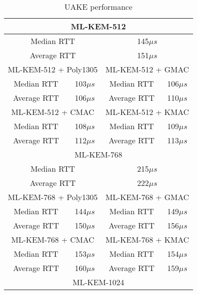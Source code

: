\documentclass[floatrow,journal=tches,submission]{iacrtrans}
\newcommand{\us}{\mu s}
\begin{document}
\begin{table}[H]
    \caption{UAKE performance}\label{tbl:uake}
    \begin{tabular}{|c|c|c|c|}
        \hline
        \multicolumn{4}{|c|}{ML-KEM-512} \\
        \hline
        \multicolumn{2}{|c|}{Median RTT}
        & \multicolumn{2}{|c|}{145$\us$} \\
        \hline
        \multicolumn{2}{|c|}{Average RTT}
        & \multicolumn{2}{|c|}{151$\us$} \\
        \hline\hline
        \multicolumn{2}{|c|}{ML-KEM-512 + Poly1305}
        & \multicolumn{2}{|c|}{ML-KEM-512 + GMAC} \\
        \hline
        Median RTT & 103$\us$ & Median RTT & 106$\us$ \\
        \hline
        Average RTT & 106$\us$ & Average RTT & 110$\us$ \\
        \hline\hline
        \multicolumn{2}{|c|}{ML-KEM-512 + CMAC}
        & \multicolumn{2}{|c|}{ML-KEM-512 + KMAC} \\
        \hline
        Median RTT & 108$\us$ & Median RTT & 109$\us$ \\
        \hline
        Average RTT & 112$\us$ & Average RTT & 113$\us$ \\
        \hline
        \multicolumn{4}{|c|}{ML-KEM-768} \\
        \hline
        \multicolumn{2}{|c|}{Median RTT}
        & \multicolumn{2}{|c|}{215$\us$} \\
        \hline
        \multicolumn{2}{|c|}{Average RTT}
        & \multicolumn{2}{|c|}{222$\us$} \\
        \hline\hline
        \multicolumn{2}{|c|}{ML-KEM-768 + Poly1305}
        & \multicolumn{2}{|c|}{ML-KEM-768 + GMAC} \\
        \hline
        Median RTT & 144$\us$ & Median RTT & 149$\us$ \\
        \hline
        Average RTT & 150$\us$ & Average RTT & 156$\us$ \\
        \hline\hline
        \multicolumn{2}{|c|}{ML-KEM-768 + CMAC}
        & \multicolumn{2}{|c|}{ML-KEM-768 + KMAC} \\
        \hline
        Median RTT & 153$\us$ & Median RTT & 154$\us$ \\
        \hline
        Average RTT & 160$\us$ & Average RTT & 159$\us$ \\
        \hline
        \multicolumn{4}{|c|}{ML-KEM-1024} \\
        \hline

\end{tabular}
\end{table}
\end{document}
